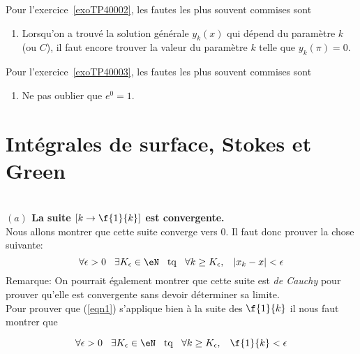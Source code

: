 Pour l'exercice~\ref{exoTP40002}, les fautes les plus souvent commises sont
\begin{enumerate}

	\item
		Lorsqu'on a trouvé la solution générale $y_k(x)$ qui dépend du paramètre $k$ (ou $C$), il faut encore trouver la valeur du paramètre $k$ telle que $y_k(\pi)=0$.

\end{enumerate}

Pour l'exercice~\ref{exoTP40003}, les fautes les plus souvent commises sont
\begin{enumerate}

	\item
		Ne pas oublier que $e^0=1$.
\end{enumerate}



\section{Intégrales de surface, Stokes et Green}


\setcounter{CountExercice}{0}


\\

{\bf $(a)$ La suite $[k\rightarrow \f{1}{k}]$ est convergente.}\\

\noindent Nous allons montrer que cette suite converge vers $0$. Il faut donc prouver la chose suivante:
   \begin{equation}\label{eqn1}\forall \epsilon >0 \hspace{0,3cm} \exists K_\epsilon \in \eN \hspace{0,3cm} {\rm tq}  \hspace{0,3cm}  \forall k\geq K_\epsilon, \hspace{0,3cm}  |x_k-x|<\epsilon\end{equation}
{Remarque}: On pourrait également montrer que cette suite est {\it de Cauchy} pour prouver qu'elle est convergente sans devoir déterminer sa limite.\\

\noindent Pour prouver que (\ref{eqn1}) s'applique bien à la suite des $\f{1}{k}$ il nous faut montrer que

   \begin{equation}\label{eqn2}\forall \epsilon >0 \hspace{0,3cm} \exists K_\epsilon \in \eN \hspace{0,3cm} {\rm tq}  \hspace{0,3cm}  \forall k\geq K_\epsilon,  \hspace{0,3cm} \f{1}{k}<\epsilon\end{equation}

